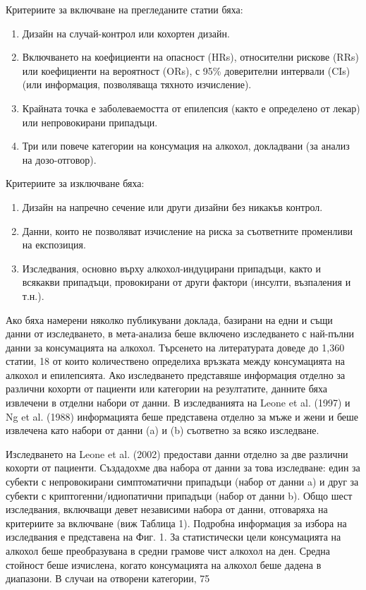 \documentclass{article}
\begin{document}
Критериите за включване на прегледаните статии бяха:
\begin{enumerate}
  \item Дизайн на случай-контрол или кохортен дизайн.
  \item Включването на коефициенти на опасност (HRs), относителни рискове (RRs) или коефициенти на вероятност (ORs), с 95\% доверителни интервали (CIs) (или информация, позволяваща тяхното изчисление).
  \item Крайната точка е заболеваемостта от епилепсия (както е определено от лекар) или непровокирани припадъци.
  \item Три или повече категории на консумация на алкохол, докладвани (за анализ на дозо-отговор).
\end{enumerate}

Критериите за изключване бяха:
\begin{enumerate}
  \item Дизайн на напречно сечение или други дизайни без никакъв контрол.
  \item Данни, които не позволяват изчисление на риска за съответните променливи на експозиция.
  \item Изследвания, основно върху алкохол-индуцирани припадъци, както и всякакви припадъци, провокирани от други фактори (инсулти, възпаления и т.н.).
\end{enumerate}



Ако бяха намерени няколко публикувани доклада, базирани на едни и същи данни от изследването, в мета-анализа беше включено изследването с най-пълни данни за консумацията на алкохол. Търсенето на литературата доведе до 1,360 статии, 18 от които количествено определиха връзката между консумацията на алкохол и епилепсията. Ако изследването представяше информация отделно за различни кохорти от пациенти или категории на резултатите, данните бяха извлечени в отделни набори от данни. В изследванията на Leone et al. (1997) и Ng et al. (1988) информацията беше представена отделно за мъже и жени и беше извлечена като набори от данни (a) и (b) съответно за всяко изследване.

Изследването на Leone et al. (2002) предостави данни отделно за две различни кохорти от пациенти. Създадохме два набора от данни за това изследване: един за субекти с непровокирани симптоматични припадъци (набор от данни a) и друг за субекти с криптогенни/идиопатични припадъци (набор от данни b). Общо шест изследвания, включващи девет независими набора от данни, отговаряха на критериите за включване (виж Таблица 1). Подробна информация за избора на изследвания е представена на Фиг. 1. За статистически цели консумацията на алкохол беше преобразувана в средни грамове чист алкохол на ден. Средна стойност беше изчислена, когато консумацията на алкохол беше дадена в диапазони. В случаи на отворени категории, 75%
\end{document}
